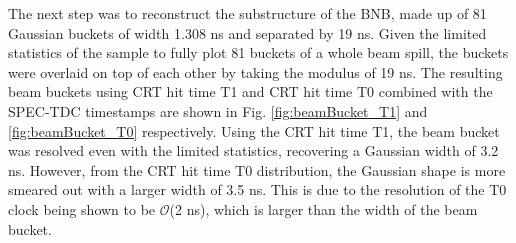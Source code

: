 
The next step was to reconstruct the substructure of the BNB, made up of 81 Gaussian buckets of width 1.308 ns and separated by 19 ns.
Given the limited statistics of the sample to fully plot 81 buckets of a whole beam spill, the buckets were overlaid on top of each other by taking the modulus of 19 ns.
The resulting beam buckets using CRT hit time T1 and CRT hit time T0 combined with the SPEC-TDC timestamps are shown in Fig. \ref{fig:beamBucket_T1} and \ref{fig:beamBucket_T0} respectively.
Using the CRT hit time T1, the beam bucket was resolved even with the limited statistics, recovering a Gaussian width of 3.2 ns.
However, from the CRT hit time T0 distribution, the Gaussian shape is more smeared out with a larger width of 3.5 ns. 
This is due to the resolution of the T0 clock being shown to be $\mathcal{O}$(2 ns), which is larger than the width of the beam bucket.

